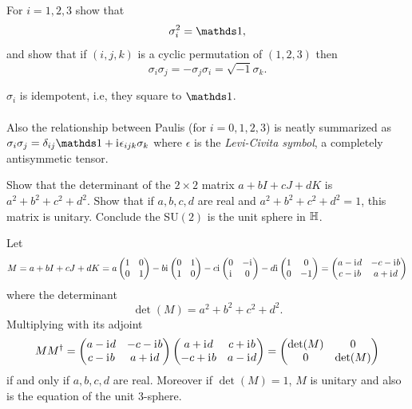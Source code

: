 \documentclass[10pt]{article}
\begin{document}
\begin{example}\label{b2e19}
	For $i=1,2,3$ show that
	$$
	\sigma_i^2=\id,
	$$
	and show that if $(i,j,k)$ is a cyclic permutation of $(1,2,3)$ then
	$$
	\sigma_i\sigma_j=-\sigma_j\sigma_i=\sqrt{-1}\sigma_k.
	$$
\end{example}
\sol $\sigma_i$ is idempotent, i.e, they square to $\id$.\\\\
Also the relationship between Paulis (for $i=0,1,2,3$) is neatly summarized as $\sigma_i\sigma_j=\delta_{ij}\id +\di\epsilon_{ijk}\sigma_k$ where $\epsilon$ is the \emph{Levi-Civita symbol}, a completely antisymmetic tensor.


\begin{example}
	Show that the determinant of the $2\times2$ matrix $a+bI+cJ+dK$ is $a^2+b^2+c^2+d^2$. Show that if $a,b,c,d$ are real and $a^2+b^2+c^2+d^2=1$, this matrix is unitary. Conclude the SU$(2)$ is the unit sphere in $\mathbb{H}$.
\end{example}
\sol Let
$$
M = a+bI+cJ+dK = a\begin{pmatrix}
	1&0\\0&1
\end{pmatrix} -b\mathrm{i}\mkern1mu \begin{pmatrix}
	0&1\\1&0
\end{pmatrix} -c\mathrm{i}\mkern1mu \begin{pmatrix}
	0&-\mathrm{i}\mkern1mu\\\mathrm{i}\mkern1mu&0
\end{pmatrix} -d\mathrm{i}\mkern1mu \begin{pmatrix}
	1&0\\0&-1
\end{pmatrix} = \begin{pmatrix}
	a-\mathrm{i}\mkern1mu d&-c-\mathrm{i}\mkern1mu b\\c-\mathrm{i}\mkern1mu b&a+\mathrm{i}\mkern1mu d
\end{pmatrix}
$$
where the determinant
$$
\det (M) = a^2+b^2+c^2+d^2.
$$
Multiplying with its adjoint
$$
MM^\dag = \begin{pmatrix}
	a-\mathrm{i}\mkern1mu d&-c-\mathrm{i}\mkern1mu b\\c-\mathrm{i}\mkern1mu b&a+\mathrm{i}\mkern1mu d
\end{pmatrix} \begin{pmatrix}
	a+\mathrm{i}\mkern1mu d&c+\mathrm{i}\mkern1mu b\\-c+\mathrm{i}\mkern1mu b&a-\mathrm{i}\mkern1mu d
\end{pmatrix} = \begin{pmatrix}
	\det (M)&0\\0&\det (M)
\end{pmatrix}
$$
if and only if $a,b,c,d$ are real. Moreover if $\det (M) = 1$, $M$ is unitary and also is the equation of the unit 3-sphere.
\end{document}
